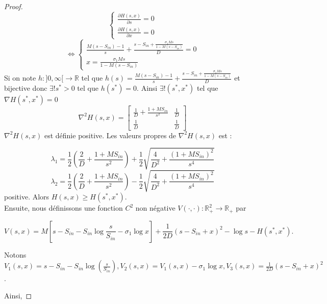 \documentclass[12pt,a4paper]{report}%
\begin{document}
\begin{proof}
	$$
	\begin{cases}
		\frac{\partial H(s, x)}{\partial s}=0\\
		\frac{\partial H(s, x)}{\partial x}=0
	\end{cases}
	$$
	$$
	\Leftrightarrow \begin{cases}
		\frac{M(s-S_{in})-1}{s}+\frac{s-S_{in}+\frac{\sigma_1 M s}{1-M(s-S_{in})}}{D}=0\\
		x=\frac{\sigma_1 M s}{1-M(s-S_{in})}
	\end{cases}
	$$
	Si on note $h :]0,\infty [\rightarrow \mathbb{R}$ tel que  $h(s)=\frac{M(s-S_{in})-1}{s}+\frac{s-S_{in}+\frac{\sigma_1 M s}{1-M(s-S_{in})}}{D}$  et bijective  donc  $\exists !s^* >0$ tel que $h(s^*)=0$. Ainsi $\exists !(s^*,x^*)$ tel que  $\nabla H(s^*,x^*)=0$\\
	$$
	\nabla^2 H(s, x)=\begin{bmatrix}
		\frac{1}{D}+\frac{1+MS_{in}}{s^2} & \frac{1}{D} \\
		\frac{1}{D} & \frac{1}{D}
	\end{bmatrix}
	$$
	$\nabla^2 H(s, x) $ est définie positive. Les valeurs propres de $\nabla^2 H(s, x) $ est :
	
	\[ \lambda_1 = \frac{1}{2}\left(\frac{2}{D} + \frac{1 + MS_{in}}{s^2}\right) + \frac{1}{2}\sqrt{\frac{4}{D^2} + \frac{(1 + MS_{in})^2}{s^4}} \]
	\[ \lambda_2 = \frac{1}{2}\left(\frac{2}{D} + \frac{1 + MS_{in}}{s^2}\right) - \frac{1}{2}\sqrt{\frac{4}{D^2} + \frac{(1 + MS_{in})^2}{s^4}} \] 
	positive. Alors $ H(s, x) \geqslant  H(s^*,x^*)$.\\
	Ensuite, nous définissons une fonction \(C^2\) non négative \(V(\cdot, \cdot) : \mathbb{R}_{+}^2 \rightarrow \mathbb{R}_{+}\) par
	
	$$
	V(s, x)= M\left[s - S_{in} - S_{in} \log \frac{s}{S_{in}} - \sigma_1 \log x\right] + \frac{1}{2D}\left(s - S_{in} +  x \right)^2 - \log s - H(s^*,x^*).
	$$
	
	Notons\\
	\(V_1(s, x)=s - S_{in} - S_{in} \log( \frac{s}{S_{in}}), V_2(s, x)=V_1(s, x)-\sigma_1 \log x, V_3(s, x)=\frac{1}{2D}\left(s - S_{in} +  x \right)^2\).
	
	Ainsi,
	

\end{proof}
\end{document}
